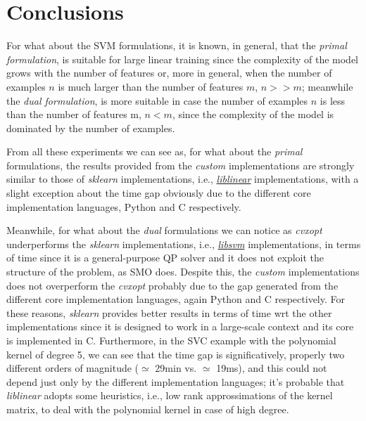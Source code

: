 \section{Conclusions}

For what about the SVM formulations, it is known, in general, that the \emph{primal formulation}, is suitable for large linear training since the complexity of the model grows with the number of features or, more in general, when the number of examples $n$ is much larger than the number of features $m$, $n >> m$; meanwhile the \emph{dual formulation}, is more suitable in case the number of examples $n$ is less than the number of features m, $n < m$, since the complexity of the model is dominated by the number of examples.

From all these experiments we can see as, for what about the \emph{primal} formulations, the results provided from the \emph{custom} implementations are strongly similar to those of \emph{sklearn} implementations, i.e., \href{https://www.csie.ntu.edu.tw/~cjlin/liblinear}{\emph{liblinear}} implementations, with a slight exception about the time gap obviously due to the different core implementation languages, Python and C respectively.

Meanwhile, for what about the \emph{dual} formulations we can notice as \emph{cvxopt} underperforms the \emph{sklearn} implementations, i.e., \href{https://www.csie.ntu.edu.tw/~cjlin/libsvm}{\emph{libsvm}} implementations, in terms of time since it is a general-purpose QP solver and it does not exploit the structure of the problem, as SMO does.
Despite this, the \emph{custom} implementations does not overperform the \emph{cvxopt} probably due to the gap generated from the different core implementation languages, again Python and C respectively.
For these reasons, \emph{sklearn} provides better results in terms of time wrt the other implementations since it is designed to work in a large-scale context and its core is implemented in C.
Furthermore, in the SVC example with the polynomial kernel of degree 5, we can see that the time gap is significatively, properly two different orders of magnitude ($\simeq$ 29min vs. $\simeq$ 19ms), and this could not depend just only by the different implementation languages; it's probable that \emph{liblinear} adopts some heuristics, i.e., low rank approssimations of the kernel matrix, to deal with the polynomial kernel in case of high degree.


